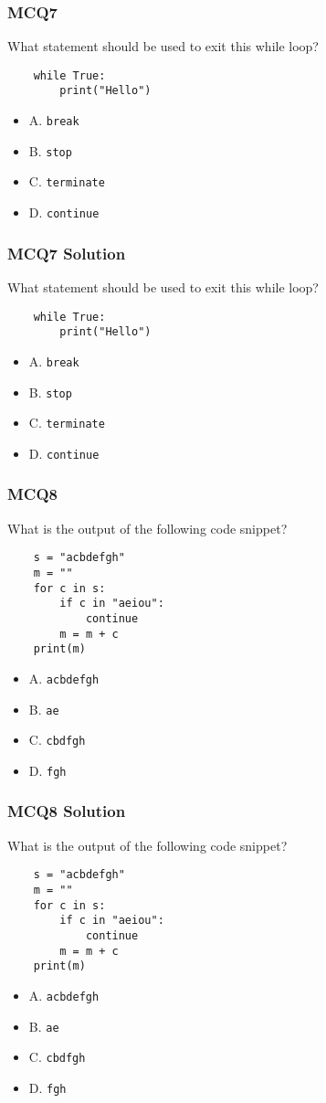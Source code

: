 \documentclass{beamer}
\begin{document}
\begin{frame}[fragile]
    \frametitle{MCQ7}
    What statement should be used to exit this while loop?
    \begin{verbatim}
    while True:
        print("Hello")
    \end{verbatim}
    \begin{itemize}
        \item A. \texttt{break}
        \item B. \texttt{stop}
        \item C. \texttt{terminate}
        \item D. \texttt{continue}
    \end{itemize}
\end{frame}
\begin{frame}[fragile]
    \frametitle{MCQ7 Solution}
    What statement should be used to exit this while loop?
    \begin{verbatim}
    while True:
        print("Hello")
    \end{verbatim}
    \begin{itemize}
        \item \alert{A. \texttt{break}}
        \item B. \texttt{stop}
        \item C. \texttt{terminate}
        \item D. \texttt{continue}
    \end{itemize}
\end{frame}

\begin{frame}[fragile]
    \frametitle{MCQ8}
    What is the output of the following code snippet?
    \begin{verbatim}
    s = "acbdefgh"
    m = ""
    for c in s:
        if c in "aeiou":
            continue
        m = m + c
    print(m)
    \end{verbatim}
    \begin{itemize}
        \item A. \texttt{acbdefgh}
        \item B. \texttt{ae}
        \item C. \texttt{cbdfgh}
        \item D. \texttt{fgh}
    \end{itemize}
\end{frame}
\begin{frame}[fragile]
    \frametitle{MCQ8 Solution}
    What is the output of the following code snippet?
    \begin{verbatim}
    s = "acbdefgh"
    m = ""
    for c in s:
        if c in "aeiou":
            continue
        m = m + c
    print(m)
    \end{verbatim}
    \begin{itemize}
        \item A. \texttt{acbdefgh}
        \item B. \texttt{ae}
        \item C. \alert{\texttt{cbdfgh}}
        \item D. \texttt{fgh}
    \end{itemize}
\end{frame}
\end{document}
